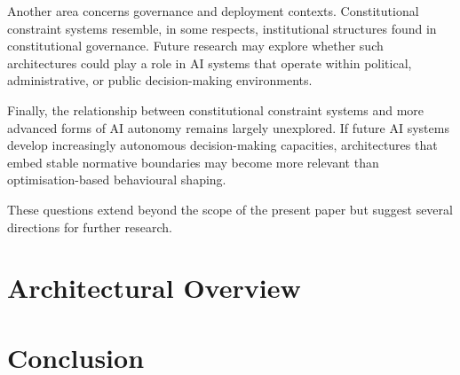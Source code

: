 \documentclass[11pt]{article}
\begin{document}
Another area concerns governance and deployment contexts. Constitutional constraint systems resemble, in some respects, institutional structures found in constitutional governance. Future research may explore whether such architectures could play a role in AI systems that operate within political, administrative, or public decision-making environments.

Finally, the relationship between constitutional constraint systems and more advanced forms of AI autonomy remains largely unexplored. If future AI systems develop increasingly autonomous decision-making capacities, architectures that embed stable normative boundaries may become more relevant than optimisation-based behavioural shaping.

These questions extend beyond the scope of the present paper but suggest several directions for further research.

\section{Architectural Overview}

\begin{center}


\end{center}

\section{Conclusion}
\end{document}
